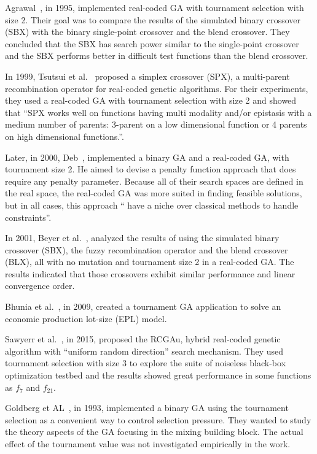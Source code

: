 Agrawal~\cite{agrawal1995simulated}, in 1995, implemented real-coded GA with tournament selection with size 2. Their goal was to compare the results of the simulated binary crossover (SBX) with the binary single-point crossover and the blend crossover. They concluded that the SBX has search power similar to the single-point crossover and the SBX performs better in difficult test functions than the blend crossover. 

In 1999, Tsutsui et al.~\cite{tsutsui1999multi} proposed a simplex crossover (SPX), a multi-parent recombination operator for real-coded genetic algorithms. For their experiments, they used a real-coded GA with tournament selection with size 2 and showed that ``SPX works well on functions having multi modality and/or epistasis with a medium number of parents: 3-parent on a low dimensional function or 4 parents on high dimensional functions.''. 

Later, in 2000, Deb~\cite{deb2000efficient}, implemented a binary GA and a real-coded GA, with tournament size 2. He aimed to devise a penalty function approach that does require any penalty parameter. Because all of their search spaces are defined in the real space, the real-coded GA was more suited in finding feasible solutions, but in all cases, this approach `` have a niche over classical methods to handle constraints''.


In 2001, Beyer et al.~\cite{beyer2001self}, analyzed the results of using the simulated binary crossover (SBX), the fuzzy recombination operator and the blend crossover (BLX), all with no mutation and tournament size 2 in a real-coded GA. The results indicated that those crossovers exhibit similar performance and linear convergence order.


Bhunia et al.~\cite{bhunia2009application}, in 2009, created a tournament GA application to solve an economic production lot-size (EPL) model. 

Sawyerr et al.~\cite{sawyerr2015benchmarking}, in 2015, proposed the RCGAu, hybrid real-coded genetic algorithm with ``uniform random direction'' search mechanism. They used tournament selection with size 3 to explore the suite of noiseless black-box optimization testbed and the results showed great performance in some functions as $f_7$ and $f_{21}$.

Goldberg et AL~\cite{goldberg1993toward}, in 1993, implemented a binary GA using the tournament selection as a convenient way to control selection pressure. They wanted to study the theory aspects of the GA focusing in the mixing building block. The actual effect of the tournament value was not investigated empirically in the work.

